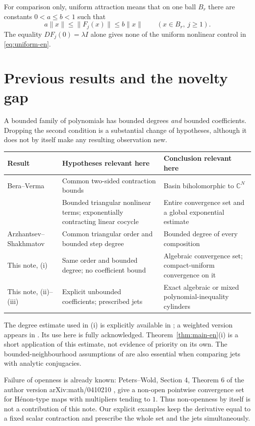 \documentclass[12pt]{amsart}
\theoremstyle{definition}
\theoremstyle{remark}
\numberwithin{equation}{section}
\newcommand{\C}{\mathbb{C}}
\begin{document}
For comparison only, uniform attraction means that on one ball $B_r$ there are constants $0<a\leq b<1$ such that
\begin{equation}\label{eq:uniform-en}
a\|x\|\leq\|F_j(x)\|\leq b\|x\|\qquad(x\in B_r,\ j\geq1).
\end{equation}
The equality $DF_j(0)=\lambda I$ alone gives none of the uniform nonlinear control in \eqref{eq:uniform-en}.

\section{Previous results and the novelty gap}
A bounded family of polynomials has bounded degrees \emph{and} bounded coefficients. Dropping the second condition is a substantial change of hypotheses, although it does not by itself make any resulting observation new.

\begin{center}
\small
\begin{tabular}{p{2.55cm}|p{5.05cm}|p{5.4cm}}
Result & Hypotheses relevant here & Conclusion relevant here\\\hline
Bera--Verma & Common two-sided contraction bounds & Basin biholomorphic to $\C^N$\\
\cite{AAM-en} & Bounded triangular nonlinear terms; exponentially contracting linear cocycle & Entire convergence set and a global exponential estimate\\
Arzhantsev--Shakhmatov & Common triangular order and bounded step degree & Bounded degree of every composition\\
This note, (i) & Same order and bounded degree; no coefficient bound & Algebraic convergence set; compact-uniform convergence on it\\
This note, (ii)--(iii) & Explicit unbounded coefficients; prescribed jets & Exact algebraic or mixed polynomial-inequality cylinders
\end{tabular}
\end{center}

The degree estimate used in (i) is explicitly available in \cite[Lemma 1]{AS-en}; a weighted version appears in \cite[Lemma 6.2]{AAM-en}. Its use here is fully acknowledged. Theorem~\ref{thm:main-en}(i) is a short application of this estimate, not evidence of priority on its own. The bounded-neighbourhood assumptions of \cite[Theorem A.1]{AAM-en} are also essential when comparing jets with analytic conjugacies.

Failure of openness is already known: Peters--Wold, Section 4, Theorem 6 of the author version arXiv:math/0410210 \cite{PW-en}, give a non-open pointwise convergence set for H\'enon-type maps with multipliers tending to $1$. Thus non-openness by itself is not a contribution of this note. Our explicit examples keep the derivative equal to a fixed scalar contraction and prescribe the whole set and the jets simultaneously.
\end{document}
